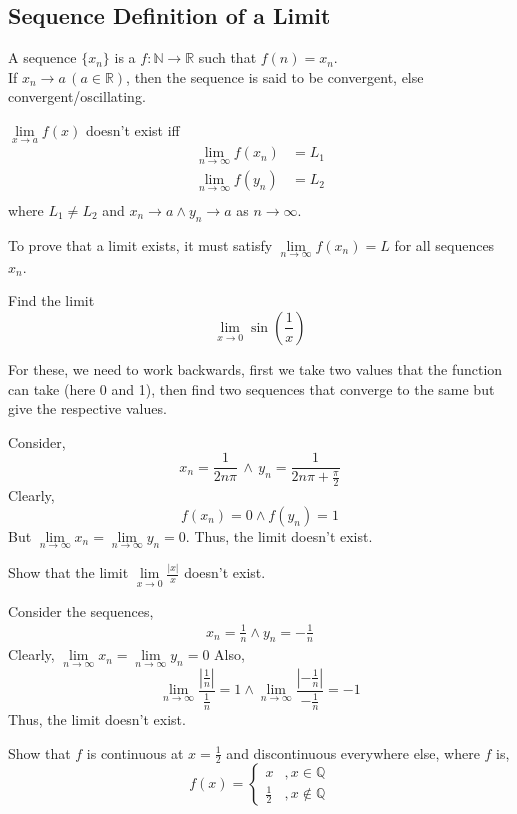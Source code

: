 	\subsection{Sequence Definition of a Limit}
	A sequence $\{x_n\}$ is a $f:\mathbb{N}\to \mathbb{R}$ such that $f(n)=x_n$.\\
	If $x_n \to a \, (a\in \mathbb{R})$, then the sequence is said to be convergent, else convergent/oscillating.
	\begin{theorem}
		$\lim\limits_{x\to a}f(x)$ doesn't exist iff 
		\[\begin{split}
			\lim\limits_{n\to \infty} f(x_n)&=L_1\\
			\lim\limits_{n\to \infty} f(y_n)&=L_2\\
		\end{split}\]
		where $L_1\neq L_2$ and $x_n\to a \land y_n \to a$ as $n\to \infty$.
	\end{theorem}
	To prove that a limit exists, it must satisfy $\lim\limits_{n\to\infty}f(x_n)=L$ for all sequences $x_n$.
	\begin{eg}
		Find the limit
		\[\lim\limits_{x\to 0} \sin(\frac{1}{x})\]
	\end{eg}
	For these, we need to work backwards, first we take two values that the function can take (here 0 and 1), then find two sequences that converge to the same but give the respective values.
	\begin{explanation}
		Consider,
		\[x_n=\frac{1}{2n\pi} \, \land \, y_n=\frac{1}{2n\pi+\frac{\pi}{2}}\]
		Clearly,
		\[f(x_n)=0\land f(y_n)=1\]
		But $\lim\limits_{n\to\infty}x_n=\lim\limits_{n\to\infty}y_n=0$. Thus, the limit doesn't exist.
	\end{explanation}
	\begin{eg}[Someone]
		Show that the limit $\lim\limits_{x\to 0} \frac{|x|}{x}$ doesn't exist.
	\end{eg}
	\begin{explanation}
		Consider the sequences,
	\[	\begin{split}
			x_n=\frac{1}{n} \land y_n=-\frac{1}{n}
		\end{split}\]
		Clearly, $\lim\limits_{n\to \infty}x_n=\lim\limits_{n\to \infty}y_n=0$
		Also,
		\[\lim\limits_{n\to \infty} \frac{|\frac{1}{n}|}{\frac{1}{n}}=1 \land \lim\limits_{n\to \infty} \frac{|-\frac{1}{n}|}{-\frac{1}{n}}=-1 \]
		Thus, the limit doesn't exist.
	\end{explanation}
	\begin{eg}
		Show that $f$ is continuous at $x=\frac{1}{2}$ and discontinuous everywhere else, where $f$ is,
		\[f(x)=\begin{cases}
			x &, x\in \mathbb{Q}\\
			\frac{1}{2} &, x\notin \mathbb{Q}
		\end{cases}\]
	\end{eg}
